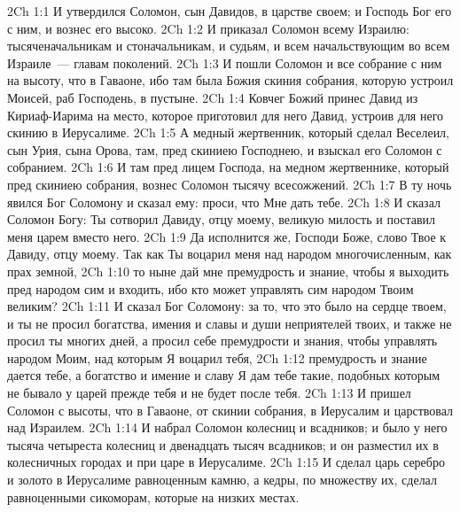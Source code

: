 \vs 2Ch 1:1 И утвердился Соломон, сын Давидов, в царстве своем; и Господь Бог его  с ним, и вознес его высоко.
\vs 2Ch 1:2 И приказал Соломон  всему Израилю: тысяченачальникам и стоначальникам, и судьям, и всем начальствующим во всем Израиле~--- главам поколений.
\vs 2Ch 1:3 И пошли Соломон и все собрание с ним на высоту, что в Гаваоне, ибо там была Божия скиния собрания, которую устроил Моисей, раб Господень, в пустыне.
\vs 2Ch 1:4 Ковчег Божий принес Давид из Кириаф-Иарима на место, которое приготовил для него Давид, устроив для него скинию в Иерусалиме.
\vs 2Ch 1:5 А медный жертвенник, который сделал Веселеил, сын Урия, сына Орова,  там, пред скиниею Господнею, и взыскал его Соломон с собранием.
\vs 2Ch 1:6 И там пред лицем Господа, на медном жертвеннике, который пред скиниею собрания, вознес Соломон тысячу всесожжений.
\rsbpar\vs 2Ch 1:7 В ту ночь явился Бог Соломону и сказал ему: проси, что Мне дать тебе.
\vs 2Ch 1:8 И сказал Соломон Богу: Ты сотворил Давиду, отцу моему, великую милость и поставил меня царем вместо него.
\vs 2Ch 1:9 Да исполнится же, Господи Боже, слово Твое к Давиду, отцу моему. Так как Ты воцарил меня над народом многочисленным, как прах земной,
\vs 2Ch 1:10 то ныне дай мне премудрость и знание, чтобы я  выходить пред народом сим и входить, ибо кто может управлять сим народом Твоим великим?
\vs 2Ch 1:11 И сказал Бог Соломону: за то, что это было на сердце твоем, и ты не просил богатства, имения и славы и души неприятелей твоих, и также не просил ты многих дней, а просил себе премудрости и знания, чтобы управлять народом Моим, над которым Я воцарил тебя,
\vs 2Ch 1:12 премудрость и знание дается тебе, а богатство и имение и славу Я дам тебе такие, подобных которым не бывало у царей прежде тебя и не будет после тебя.
\rsbpar\vs 2Ch 1:13 И пришел Соломон с высоты, что в Гаваоне, от скинии собрания, в Иерусалим и царствовал над Израилем.
\vs 2Ch 1:14 И набрал Соломон колесниц и всадников; и было у него тысяча четыреста колесниц и двенадцать тысяч всадников; и он разместил их в колесничных городах и при царе в Иерусалиме.
\vs 2Ch 1:15 И сделал царь серебро и золото в Иерусалиме равноценным  камню, а кедры, по множеству их, сделал равноценными сикоморам, которые на низких местах.
